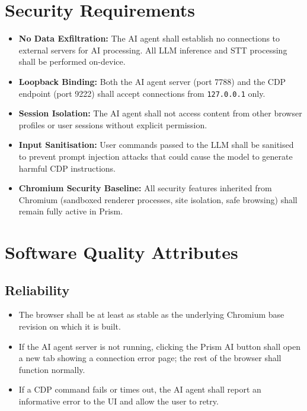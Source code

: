 \section{Security Requirements}
\begin{itemize}[leftmargin=*]
    \item \textbf{No Data Exfiltration:} The AI agent shall establish no connections to external servers for AI processing. All LLM inference and STT processing shall be performed on-device.
    \item \textbf{Loopback Binding:} Both the AI agent server (port 7788) and the CDP endpoint (port 9222) shall accept connections from \texttt{127.0.0.1} only.
    \item \textbf{Session Isolation:} The AI agent shall not access content from other browser profiles or user sessions without explicit permission.
    \item \textbf{Input Sanitisation:} User commands passed to the LLM shall be sanitised to prevent prompt injection attacks that could cause the model to generate harmful CDP instructions.
    \item \textbf{Chromium Security Baseline:} All security features inherited from Chromium (sandboxed renderer processes, site isolation, safe browsing) shall remain fully active in Prism.
\end{itemize}

\section{Software Quality Attributes}

\subsection{Reliability}
\begin{itemize}[leftmargin=*]
    \item The browser shall be at least as stable as the underlying Chromium base revision on which it is built.
    \item If the AI agent server is not running, clicking the Prism AI button shall open a new tab showing a connection error page; the rest of the browser shall function normally.
    \item If a CDP command fails or times out, the AI agent shall report an informative error to the UI and allow the user to retry.
\end{itemize}

